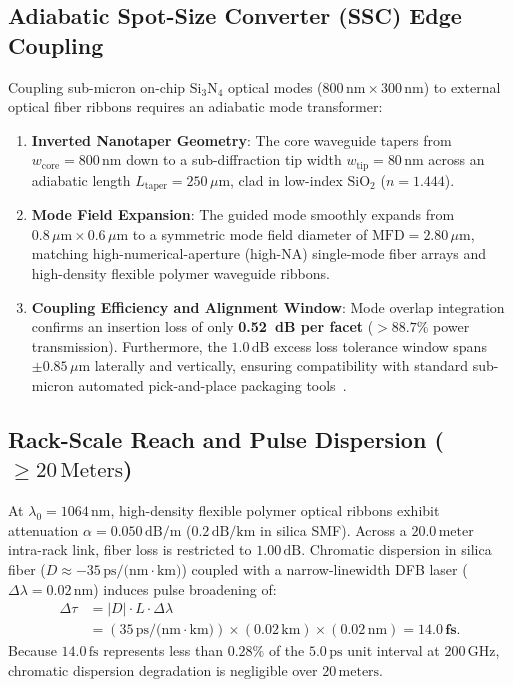 \documentclass[journal]{IEEEtran}
\begin{document}
\subsection{Adiabatic Spot-Size Converter (SSC) Edge Coupling}
Coupling sub-micron on-chip $\text{Si}_3\text{N}_4$ optical modes ($800\,\text{nm} \times 300\,\text{nm}$) to external optical fiber ribbons requires an adiabatic mode transformer:
\begin{enumerate}
    \item \textbf{Inverted Nanotaper Geometry}: The core waveguide tapers from $w_{\text{core}} = 800\,\text{nm}$ down to a sub-diffraction tip width $w_{\text{tip}} = 80\,\text{nm}$ across an adiabatic length $L_{\text{taper}} = 250\,\mu\text{m}$, clad in low-index $\text{SiO}_2$ ($n = 1.444$).
    \item \textbf{Mode Field Expansion}: The guided mode smoothly expands from $0.8\,\mu\text{m} \times 0.6\,\mu\text{m}$ to a symmetric mode field diameter of $\text{MFD} = 2.80\,\mu\text{m}$, matching high-numerical-aperture (high-NA) single-mode fiber arrays and high-density flexible polymer waveguide ribbons.
    \item \textbf{Coupling Efficiency and Alignment Window}: Mode overlap integration confirms an insertion loss of only \textbf{0.52~dB per facet} ($>88.7\%$ power transmission). Furthermore, the $1.0\,\text{dB}$ excess loss tolerance window spans $\pm 0.85\,\mu\text{m}$ laterally and vertically, ensuring compatibility with standard sub-micron automated pick-and-place packaging tools~\cite{omi_sim_report}.
\end{enumerate}

\subsection{Rack-Scale Reach and Pulse Dispersion ($\ge 20\,\text{Meters}$)}
At $\lambda_0 = 1064\,\text{nm}$, high-density flexible polymer optical ribbons exhibit attenuation $\alpha = 0.050\,\text{dB/m}$ ($0.2\,\text{dB/km}$ in silica SMF). Across a $20.0\,\text{meter}$ intra-rack link, fiber loss is restricted to $1.00\,\text{dB}$. Chromatic dispersion in silica fiber ($D \approx -35\,\text{ps/(nm}\cdot\text{km)}$) coupled with a narrow-linewidth DFB laser ($\Delta\lambda = 0.02\,\text{nm}$) induces pulse broadening of:
\begin{align}
    \Delta\tau &= |D| \cdot L \cdot \Delta\lambda \nonumber \\
    &= (35\,\text{ps/(nm}\cdot\text{km)}) \times (0.02\,\text{km}) \times (0.02\,\text{nm}) = \mathbf{14.0\,\text{fs}}.
\end{align}
Because $14.0\,\text{fs}$ represents less than $0.28\%$ of the $5.0\,\text{ps}$ unit interval at $200\,\text{GHz}$, chromatic dispersion degradation is negligible over $20\,\text{meters}$.
\end{document}
